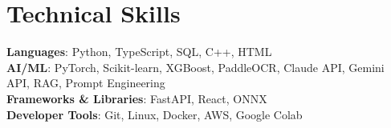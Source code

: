 \documentclass[letterpaper,11pt]{article}
\begin{document}
\section{Technical Skills}
 \begin{itemize}[leftmargin=0.15in, label={}]
    \small{\item{
     \textbf{Languages}{: Python, TypeScript, SQL, C++, HTML} \\
     \textbf{AI/ML}{: PyTorch, Scikit-learn, XGBoost, PaddleOCR, Claude API, Gemini API, RAG, Prompt Engineering} \\
     \textbf{Frameworks \& Libraries}{: FastAPI, React, ONNX} \\
     \textbf{Developer Tools}{: Git, Linux, Docker, AWS, Google Colab} \\
    }}
 \end{itemize}

\end{document}

